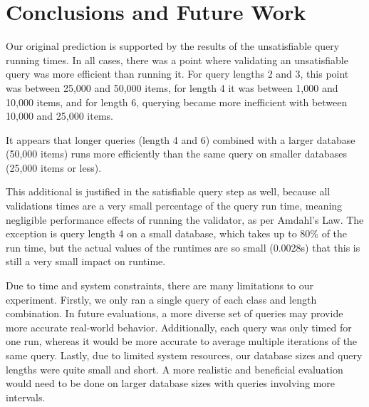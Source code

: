 \documentclass{achemso}
\begin{document}
\section{Conclusions and Future Work}
Our original prediction is supported by the results of the unsatisfiable query running times. In all cases, there was a point where validating an unsatisfiable query was more efficient than running it. For query lengths 2 and 3, this point was between 25,000 and 50,000 items, for length 4 it was between 1,000 and 10,000 items, and for length 6, querying became more inefficient with between  10,000 and 25,000 items.

It appears that longer queries (length 4 and 6) combined with a larger database (50,000 items) runs more efficiently than the same query on smaller databases (25,000 items or less). 

This additional is justified in the satisfiable query step as well, because all validations times are a very small percentage of the query run time, meaning negligible performance effects of running the validator, as per Amdahl's Law.\cite{amdahl:1967} The exception is query length 4 on a small database, which takes up to 80\% of the run time, but the actual values of the runtimes are so small (0.0028s) that this is still a very small impact on runtime. 

Due to time and system constraints, there are many limitations to our experiment. Firstly, we only ran a single query of each class and length combination. In future evaluations, a more diverse set of queries may provide more accurate real-world behavior. Additionally, each query was only timed for one run, whereas it would be more accurate to average multiple iterations of the same query. Lastly, due to limited system resources, our database sizes and query lengths were quite small and short. A more realistic and beneficial evaluation would need to be done on larger database sizes with queries involving more intervals.



\end{document}
